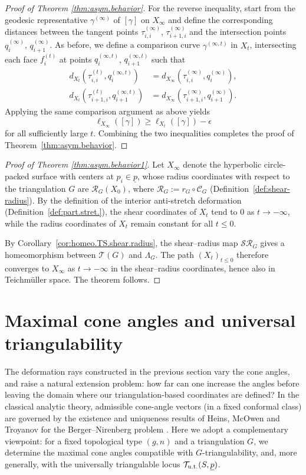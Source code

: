 \documentclass[11pt, letterpaper]{amsart}
\theoremstyle{definition}
\theoremstyle{remark}
\newcommand{\up}{\underline{p}}
\newcommand{\Sp}{(S,\up)}
\newcommand{\cC}{\mathcal{C}}
\newcommand{\cSR}{\mathcal{SR}}
\newcommand{\cR}{\mathcal{R}}
\newcommand{\cT}{\mathcal{T}}
\numberwithin{equation}{section}
\begin{document}
\begin{proof}[Proof of Theorem \ref{thm:asym.behavior}]
For the reverse inequality, start from the geodesic representative \(\gamma^{(\infty)}\) of \([\gamma]\) on \(X_{\infty}\) and define the corresponding distances between the tangent points \(\tau_{i,i}^{(\infty)}\), \(\tau_{i+1,i}^{(\infty)}\) and the intersection points \(q_i^{(\infty)}\), \(q_{i+1}^{(\infty)}\). As before, we define a comparison curve \(\gamma^{(\infty,t)}\) in \(X_t\), intersecting each face \(f_i^{(t)}\) at points \(q_{i}^{(\infty,t)}\), \(q_{i+1}^{(\infty, t)}\) such that
\[
\begin{split}
    d_{X_t}(\tau_{i,i}^{(t)}, q_{i}^{(\infty, t)})&=d_{X_{\infty}}(\tau_{i,i}^{(\infty)}, q_{i}^{(\infty)}),\\
    d_{X_t}(\tau_{i+1,i}^{(t)}, q_{i+1}^{(\infty, t)})&=d_{X_{\infty}}(\tau_{i+1,i}^{(\infty)}, q_{i+1}^{(\infty)}).
\end{split}
\]
Applying the same comparison argument as above yields
\[
  \ell_{X_{\infty}}([\gamma]) \geq \ell_{X_t}([\gamma])-\epsilon
\]
for all sufficiently large \(t\). Combining the two inequalities completes the proof of Theorem~\ref{thm:asym.behavior}.
\end{proof}

\begin{proof}[Proof of Theorem \ref{thm:asym.behavior1}]
Let \(X_{\infty}\) denote the hyperbolic circle-packed surface with centers at \(p_i\in \up\), whose radius coordinates with respect to the triangulation \(G\) are \(\cR_G(X_0)\), where \(\cR_G:=r_G\circ\cC_G\) (Definition~\ref{def:shear-radius}). By the definition of the interior anti-stretch deformation (Definition~\ref{def:part.stret.}), the shear coordinates of \(X_t\) tend to \(0\) as \(t\rightarrow -\infty\), while the radius coordinates of \(X_t\) remain constant for all \(t\leq 0\). 

By Corollary~\ref{cor:homeo.TS.shear.radius}, the shear--radius map \(\cSR_G\) gives a homeomorphism between \(\cT(G)\) and \(\Lambda_G\). The path \((X_t)_{t\leq 0}\) therefore converges to \(X_{\infty}\) as \(t\rightarrow -\infty\) in the shear--radius coordinates, hence also in Teichmüller space. The theorem follows.
\end{proof}

%
 \section{Maximal cone angles and universal triangulability}
\label{sec:max.cone.angle}

The deformation rays constructed in the previous section vary the cone angles, and
raise a natural extension problem: how far can one increase the angles before leaving
the domain where our triangulation-based coordinates are defined?
In the classical analytic theory, admissible cone-angle vectors (in a fixed conformal
class) are governed by the existence and uniqueness results of Heins, McOwen and
Troyanov for the Berger--Nirenberg problem \cite{Hei62,McO88,Tro91}.
Here we adopt a complementary viewpoint: for a fixed topological type \((g,n)\) and a
triangulation \(G\), we determine the maximal cone angles compatible with \(G\)-triangulability,
and, more generally, with the universally triangulable locus \(\cT_{\rm u.t.}\Sp\).
\end{document}
